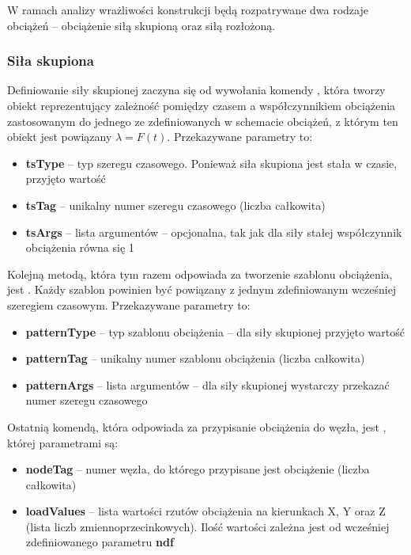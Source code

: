 W ramach analizy wrażliwości konstrukcji będą rozpatrywane dwa rodzaje obciążeń – obciążenie siłą skupioną oraz siłą rozłożoną.

\subsubsection*{Siła skupiona}

Definiowanie siły skupionej zaczyna się od wywołania komendy , która
tworzy obiekt reprezentujący zależność pomiędzy czasem a współczynnikiem obciążenia zastosowanym do jednego ze zdefiniowanych
w schemacie obciążeń, z którym ten obiekt jest powiązany $\lambda=F(t)$.
Przekazywane parametry to:

\begin{itemize}
    \item \textbf{tsType} – typ szeregu czasowego. Ponieważ siła skupiona jest stała w czasie, przyjęto wartość 
    \item \textbf{tsTag} – unikalny numer szeregu czasowego (liczba całkowita)
    \item \textbf{tsArgs} – lista argumentów – opcjonalna, tak jak dla siły stałej współczynnik obciążenia równa się 1
\end{itemize}

Kolejną metodą, która tym razem odpowiada za tworzenie szablonu obciążenia, jest .
Każdy szablon powinien być powiązany z jednym zdefiniowanym wcześniej szeregiem czasowym.
Przekazywane parametry to:

\begin{itemize}
    \item \textbf{patternType} – typ szablonu obciążenia – dla siły skupionej przyjęto wartość 
    \item \textbf{patternTag} – unikalny numer szablonu obciążenia (liczba całkowita)
    \item \textbf{patternArgs} – lista argumentów – dla siły skupionej wystarczy przekazać numer szeregu czasowego
\end{itemize}

Ostatnią komendą, która odpowiada za przypisanie obciążenia do węzła, jest ,
której parametrami są:

\begin{itemize}
    \item \textbf{nodeTag} – numer węzła, do którego przypisane jest obciążenie (liczba całkowita)
    \item \textbf{loadValues} – lista wartości rzutów obciążenia na kierunkach X, Y oraz Z (lista liczb zmiennoprzecinkowych). Ilość wartości zależna jest od wcześniej zdefiniowanego parametru \textbf{ndf}
\end{itemize}

